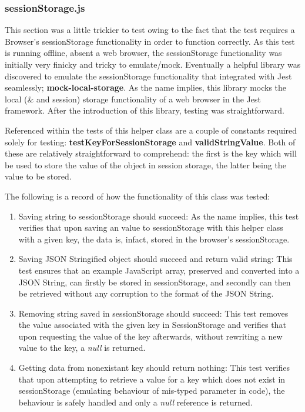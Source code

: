 \subsubsection{sessionStorage.js}
This section was a little trickier to test owing to the fact that the test requires a Browser's sessionStorage functionality in order to function correctly. As this test is running offline, absent a web browser, the sessionStorage functionality was initially very finicky and tricky to emulate/mock. Eventually a helpful library was discovered to emulate the sessionStorage functionality that integrated with Jest seamlessly; {\bf mock-local-storage}. As the name implies, this library mocks the local (\& and session) storage functionality of a web browser in the Jest framework. After the introduction of this library, testing was straightforward. 

Referenced within the tests of this helper class are a couple of constants required solely for testing: {\bf testKeyForSessionStorage} and {\bf validStringValue}. Both of these are relatively straightforward to comprehend: the first is the key which will be used to store the value of the object in session storage, the latter being the value to be stored.

The following is a record of how the functionality of this class was tested:
\begin{enumerate}
    \item Saving string to sessionStorage should succeed: As the name implies, this test verifies that upon saving an value to sessionStorage with this helper class with a given key, the data is, infact, stored in the browser's sessionStorage. 
    
    \item Saving JSON Stringified object should succeed and return valid string: This test ensures that an example JavaScript array, preserved and converted into a JSON String, can firstly be stored in sessionStorage, and secondly can then be retrieved without any corruption to the format of the JSON String. 
    
    \item Removing string saved in sessionStorage should succeed: This test removes the value associated with the given key in SessionStorage and verifies that upon requesting the value of the key afterwards, without rewriting a new value to the key, a {\it null} is returned. 
    
    \item Getting data from nonexistant key should return nothing: This test verifies that upon attempting to retrieve a value for a key which does not exist in sessionStorage (emulating behaviour of mis-typed parameter in code), the behaviour is safely handled and only a {\it null} reference is returned.
\end{enumerate}

